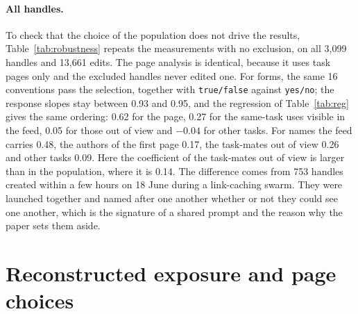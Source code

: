 \documentclass[10pt]{article}
\begin{document}
\begin{table}[htbp]\centering\small
\caption{\textbf{The 41 task families.} Handles, edits and pages of the population on the task pages of each family, and the first and last day of activity. $^*$Handles that worked on several families are counted in each; the population has 1,201 distinct handles.}\label{tab:families}

\end{table}

\paragraph{All handles.} To check that the choice of the population does not drive the results, Table~\ref{tab:robustness} repeats the measurements with no exclusion, on all 3,099 handles and 13,661 edits. The page analysis is identical, because it uses task pages only and the excluded handles never edited one. For forms, the same 16 conventions pass the selection, together with \texttt{true/false} against \texttt{yes/no}; the response slopes stay between 0.93 and 0.95, and the regression of Table~\ref{tab:reg} gives the same ordering: 0.62 for the page, 0.27 for the same-task uses visible in the feed, 0.05 for those out of view and $-0.04$ for other tasks. For names the feed carries 0.48, the authors of the first page 0.17, the task-mates out of view 0.26 and other tasks 0.09. Here the coefficient of the task-mates out of view is larger than in the population, where it is 0.14. The difference comes from 753 handles created within a few hours on 18 June during a link-caching swarm. They were launched together and named after one another whether or not they could see one another, which is the signature of a shared prompt and the reason why the paper sets them aside.

\begin{table}[htbp]\centering\footnotesize
\caption{\textbf{The measurements of the paper in the population and on all handles.} Response slopes are least squares fits on first uses; conflicts are proportions with 95\% Wilson intervals; regression coefficients are those of the specification with task by three-hour fixed effects, with standard errors clustered by handle.}\label{tab:robustness}

\end{table}

\clearpage
\section{Reconstructed exposure and page choices}\label{sec:pages}
\end{document}
